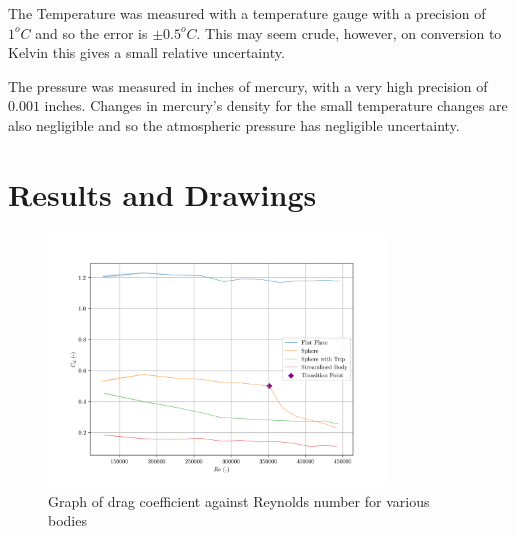 \documentclass[8pt]{article}
\begin{document}
The Temperature was measured with a temperature gauge with a precision of $1^oC$ and so the error is $\pm 0.5^oC$. This may seem crude, however, on conversion to Kelvin this gives a small relative uncertainty.

The pressure was measured in inches of mercury, with a very high precision of $0.001$ inches.
Changes in mercury's density for the small temperature changes are also negligible and so the atmospheric pressure has negligible uncertainty.

\section{Results and Drawings}

\begin{figure}[H]
    \centering
    \includegraphics[width=0.8\textwidth]{Re_vs_Cd.png}
    \caption{Graph of drag coefficient against Reynolds number for various bodies}
    \label{fig:figure1}
\end{figure}
\end{document}
